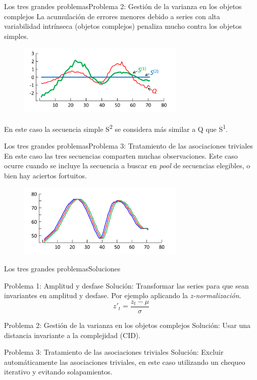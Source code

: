\documentclass[12pt, aspectratio=169]{beamer} %
\begin{document}
\begin{frame}{Los tres grandes problemas}{Problema 2:  Gestión de la varianza en los objetos complejos}
  La acumulación de errores menores debido a series con alta variabilidad intrínseca (objetos complejos) penaliza mucho contra los objetos simples.

  \begin{figure}
  \includegraphics[width=8cm]{20210312_3_problema_complejos.png}
  \label{fig:problema_2}
\end{figure}

  En este caso la secuencia simple S\textsuperscript{2} se considera  más similar a Q que S\textsuperscript{1}.

\end{frame}

\begin{frame}{Los tres grandes problemas}{Problema 3: Tratamiento de las asociaciones triviales}
  En este caso las tres secuencias comparten muchas observaciones.
  Este caso ocurre cuando se incluye la secuencia a buscar en \textit{pool} de secuencias elegibles, o bien hay aciertos fortuitos.
  \begin{figure}
    \includegraphics[width=8cm]{20210312_4_problema_triviales.png}
    \label{fig:problema_3}
  \end{figure}
  
\end{frame}

\begin{frame}{Los tres grandes problemas}{Soluciones}
  \begin{block}{Problema 1: Amplitud y desfase}
    Solución: Transformar las series para que sean invariantes en amplitud y desfase. Por ejemplo aplicando la \textit{z-normalización}.
    \[  z'_t = \frac{z_t - \mu}{\sigma} \]
  \end{block}
  \begin{block}{Problema 2: Gestión de la varianza en los objetos complejos}
    Solución: Usar una distancia invariante a la complejidad (CID). 
  \end{block}

  \begin{block}{Problema 3: Tratamiento de las asociaciones triviales}
    Solución: Excluir automáticamente las asociaciones triviales, en este caso utilizando un chequeo iterativo y evitando solapamientos.
  \end{block}
\end{frame}
\end{document}
